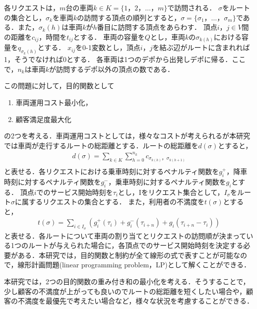 \documentclass[a4j，11pt，twocolumn]{jsarticle}
\begin{document}
各リクエストは，$m$台の車両$k \in K = \{1，2，\ldots，m\}$で訪問される．
$\sigma$をルートの集合とし，$\sigma_k$を車両$k$の訪問する頂点の順列とすると，$\sigma = \{\sigma_1，\ldots，\sigma_m\}$である．また，$\sigma_k(h)$は車両$k$が$h$番目に訪問する頂点をあらわす．
頂点$i，j \in V$間の距離を$c_{ij}$，時間を$t_{ij}$とする．
車両の容量を$Q$とし，車両$k$の$\sigma _{k(h)}$における容量を$q_{\sigma_k(h)}$とする．
$x_{ij}$を0-1変数とし，頂点$i，j$を結ぶ辺がルートに含まれれば1，そうでなければ0とする．
各車両は1つのデポから出発しデポに帰る．ここで，$n_k$は車両$k$が訪問するデポ以外の頂点の数である．

この問題に対して，目的関数として
\begin{enumerate}
 \item 車両運用コスト最小化，
 \item 顧客満足度最大化
\end{enumerate}
の2つを考える．車両運用コストとしては，様々なコストが考えられるが本研究では車両が走行するルートの総距離とする．ルートの総距離を$d(\sigma)$とすると，
\begin{align*}
d(\sigma) = \sum_ {k\in K} \sum_{h=0}^{n_k} c_ {\sigma_{k(h)}，\sigma_ {k(h+1)} }\\
\end{align*}
と表せる．各リクエストにおける乗車時刻に対するペナルティ関数を$g^+_i$，降車時刻に対するペナルティ関数を$g^-_i$，乗車時刻に対するペナルティ関数を$g_i$とする．
頂点$i$でのサービス開始時刻を$\tau_i$とし，Iをリクエスト集合として，$I_\sigma$をルート$\sigma$に属するリクエストの集合とする．
また，利用者の不満度を$t(\sigma)$とすると，
\begin{align*}
t(\sigma) = \sum_ {i \in I_\sigma} (g^+_i(\tau_i)+g^-_i(\tau_{i+n})+g_i(\tau_{i+n}-\tau_i))
\end{align*}
と表せる．各ルートについて車両の割り当てとリクエストの訪問順が決まっている1つのルートが与えられた場合に，各頂点でのサービス開始時刻を決定する必要がある．本研究では，目的関数と制約が全て線形の式で表すことが可能なので，線形計画問題(linear programming problem，LP)として解くことができる．

本研究では，2つの目的関数の重み付き和の最小化を考える．そうすることで，少し顧客の不満度が上がっても良いのでルートの総距離を短くしたい場合や，顧客の不満度を最優先で考えたい場合など，様々な状況を考慮することができる．
\end{document}
